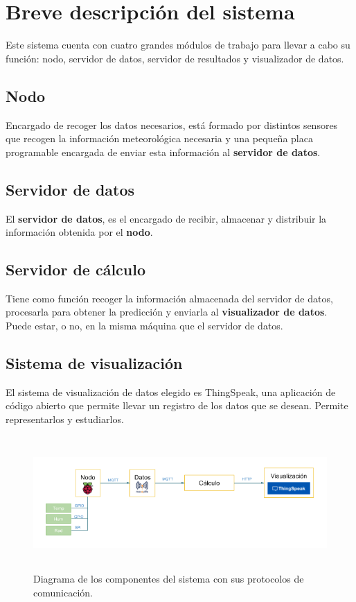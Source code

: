 \section{Breve descripción del sistema}
\label{makereference1.2}

Este sistema cuenta con cuatro grandes módulos de trabajo para llevar a cabo su función: nodo, servidor de datos, servidor de resultados y visualizador de datos.

\subsection*{Nodo}
\label{makereference1.2.1}
Encargado de recoger los datos necesarios, está formado por distintos sensores que recogen la información meteorológica necesaria y una pequeña placa programable encargada de enviar esta información al \textbf{servidor de datos}.

\subsection*{Servidor de datos}
\label{makereference1.2.2}
El \textbf{servidor de datos}, es el encargado de recibir, almacenar y distribuir la información obtenida por el \textbf{nodo}.

\subsection*{Servidor de cálculo}
\label{makereference1.2.3}
Tiene como función recoger la información almacenada del servidor de datos, procesarla para obtener la predicción y enviarla al \textbf{visualizador de datos}. Puede estar, o no, en la misma máquina que el servidor de datos.

\subsection*{Sistema de visualización}
\label{makereference1.2.3}
El sistema de visualización de datos elegido es ThingSpeak, una aplicación de código abierto que permite llevar un registro de los datos que se desean. Permite representarlos y estudiarlos.

\begin{figure}[htb]
    \begin{center}
        \includegraphics[height=2in]{figures/diagrama-sistema.png}
        \caption{Diagrama de los componentes del sistema con sus protocolos de comunicación.}
    \end{center}
    \label{diagrama-sistema}
\end{figure}
